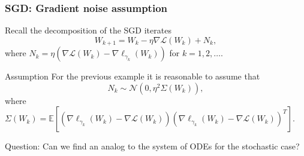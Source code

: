\documentclass[17pt,institute=e10]{tuhh_presentation}
\newcommand{\CL}{\mathcal{L}}
\newcommand{\E}[1]{\mathbb{E}\left[{#1} \right]}
\begin{document}
\begin{frame}[fragile]
  \frametitle{SGD: Gradient noise assumption}
  Recall the decomposition of the SGD iterates
  \begin{equation*}
    W_{k+1} = W_k - \eta \nabla \CL(W_k) + N_k,
  \end{equation*}
  where $N_k = \eta \left(\nabla \CL(W_k) - \nabla \ell_{\gamma_k} (W_k) \right)$ for $k = 1,2,\dots$.
  \begin{block}{Assumption \autocite{liStochasticModifiedEquations2019}}
  For the previous example it is reasonable to assume that 
  \begin{equation*}
    N_k \sim \mathcal{N}(0, \eta^2 \Sigma(W_k)),
  \end{equation*}
    where $\Sigma(W_k) = \E{\left(\nabla \ell_{\gamma_k}(W_k) - \nabla \CL(W_k)\right)\left(\nabla \ell_{\gamma_k}(W_k) - \nabla \CL(W_k)\right)^T}$.
\end{block}
Question: Can we find an analog to the system of ODEs for the stochastic case?
\end{frame}
\end{document}
